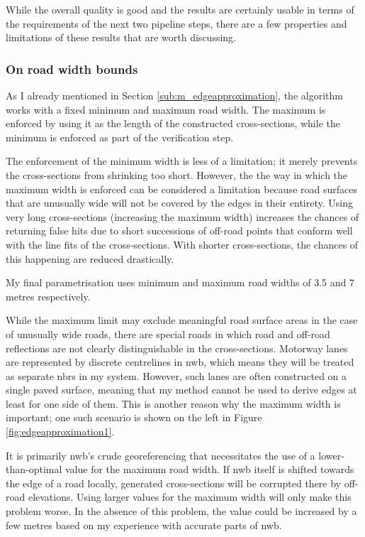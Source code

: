 While the overall quality is good and the results are certainly usable in terms of the requirements of the next two pipeline steps, there are a few properties and limitations of these results that are worth discussing.

\subsubsection{On road width bounds}

As I already mentioned in Section \ref{sub:m_edgeapproximation}, the algorithm works with a fixed minimum and maximum road width. The maximum is enforced by using it as the length of the constructed cross-sections, while the minimum is enforced as part of the verification step.

The enforcement of the minimum width is less of a limitation; it merely prevents the cross-sections from shrinking too short. However, the the way in which the maximum width is enforced can be considered a limitation because road surfaces that are unusually wide will not be covered by the edges in their entirety. Using very long cross-sections (increasing the maximum width) increases the chances of returning false hits due to short successions of off-road points that conform well with the line fits of the cross-sections. With shorter cross-sections, the chances of this happening are reduced drastically.

My final parametrisation uses minimum and maximum road widths of 3.5 and 7 metres respectively.

While the maximum limit may exclude meaningful road surface areas in the case of unusually wide roads, there are special roads in which road and off-road reflections are not clearly distinguishable in the cross-sections. Motorway lanes are represented by discrete centrelines in \ac{nwb}, which means they will be treated as separate \ac{nbrs} in my system. However, such lanes are often constructed on a single paved surface, meaning that my method cannot be used to derive edges at least for one side of them. This is another reason why the maximum width is important; one such scenario is shown on the left in Figure \ref{fig:edgeapproximation1}.

It is primarily \ac{nwb}'s crude georeferencing that necessitates the use of a lower-than-optimal value for the maximum road width. If \ac{nwb} itself is shifted towards the edge of a road locally, generated cross-sections will be corrupted there by off-road elevations. Using larger values for the maximum width will only make this problem worse. In the absence of this problem, the value could be increased by a few metres based on my experience with accurate parts of \ac{nwb}.

